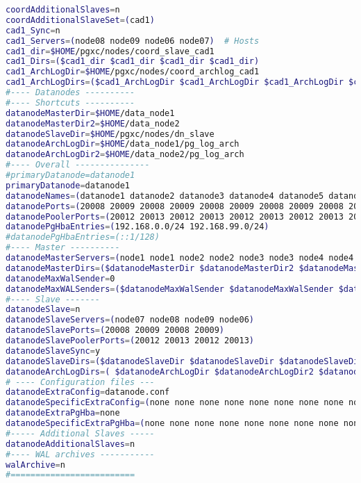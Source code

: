 \begin{lstlisting}[basicstyle=\tiny,language=bash,caption={Konfigurationsdatei pgxc-ctl},captionpos=b]
coordAdditionalSlaves=n	
coordAdditionalSlaveSet=(cad1)
cad1_Sync=n	
cad1_Servers=(node08 node09 node06 node07)	# Hosts
cad1_dir=$HOME/pgxc/nodes/coord_slave_cad1
cad1_Dirs=($cad1_dir $cad1_dir $cad1_dir $cad1_dir)
cad1_ArchLogDir=$HOME/pgxc/nodes/coord_archlog_cad1
cad1_ArchLogDirs=($cad1_ArchLogDir $cad1_ArchLogDir $cad1_ArchLogDir $cad1_ArchLogDir)
#---- Datanodes ----------
#---- Shortcuts ----------
datanodeMasterDir=$HOME/data_node1
datanodeMasterDir2=$HOME/data_node2
datanodeSlaveDir=$HOME/pgxc/nodes/dn_slave
datanodeArchLogDir=$HOME/data_node1/pg_log_arch
datanodeArchLogDir2=$HOME/data_node2/pg_log_arch
#---- Overall ---------------
#primaryDatanode=datanode1
primaryDatanode=datanode1
datanodeNames=(datanode1 datanode2 datanode3 datanode4 datanode5 datanode6 datanode7 datanode8 datanode9 datanode10 datanode11 datanode12)
datanodePorts=(20008 20009 20008 20009 20008 20009 20008 20009 20008 20009 20008 20009)
datanodePoolerPorts=(20012 20013 20012 20013 20012 20013 20012 20013 20012 20013 20012 20013)
datanodePgHbaEntries=(192.168.0.0/24 192.168.99.0/24)
#datanodePgHbaEntries=(::1/128)
#---- Master ----------
datanodeMasterServers=(node1 node1 node2 node2 node3 node3 node4 node4 node5 node5 node6 node6)	
datanodeMasterDirs=($datanodeMasterDir $datanodeMasterDir2 $datanodeMasterDir $datanodeMasterDir2 $datanodeMasterDir $datanodeMasterDir2 $datanodeMasterDir $datanodeMasterDir2 $datanodeMasterDir $datanodeMasterDir2 $datanodeMasterDir $datanodeMasterDir2)
datanodeMaxWalSender=0	
datanodeMaxWALSenders=($datanodeMaxWalSender $datanodeMaxWalSender $datanodeMaxWalSender $datanodeMaxWalSender $datanodeMaxWalSender $datanodeMaxWalSender $datanodeMaxWalSender $datanodeMaxWalSender $datanodeMaxWalSender $datanodeMaxWalSender $datanodeMaxWalSender $datanodeMaxWalSender)
#---- Slave -------
datanodeSlave=n		
datanodeSlaveServers=(node07 node08 node09 node06)
datanodeSlavePorts=(20008 20009 20008 20009)
datanodeSlavePoolerPorts=(20012 20013 20012 20013)
datanodeSlaveSync=y	
datanodeSlaveDirs=($datanodeSlaveDir $datanodeSlaveDir $datanodeSlaveDir $datanodeSlaveDir)
datanodeArchLogDirs=( $datanodeArchLogDir $datanodeArchLogDir2 $datanodeArchLogDir $datanodeArchLogDir2 $datanodeArchLogDir $datanodeArchLogDir2 $datanodeArchLogDir $datanodeArchLogDir2 $datanodeArchLogDir $datanodeArchLogDir2 $datanodeArchLogDir $datanodeArchLogDir2 )
# ---- Configuration files ---
datanodeExtraConfig=datanode.conf	
datanodeSpecificExtraConfig=(none none none none none none none none none none none none)
datanodeExtraPgHba=none	
datanodeSpecificExtraPgHba=(none none none none none none none none none none none none)
#----- Additional Slaves -----
datanodeAdditionalSlaves=n
#---- WAL archives -----------
walArchive=n
#=========================


\end{lstlisting}
